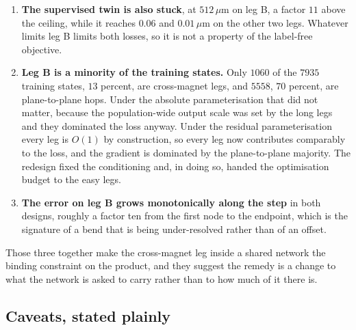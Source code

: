 \documentclass[11pt,a4paper]{article}
\newcommand{\um}{\ensuremath{\,\mu\mathrm{m}}}
\begin{document}
\begin{enumerate}
  \item \textbf{The supervised twin is also stuck}, at $512\um$ on leg B, a
  factor $11$ above the ceiling, while it reaches $0.06$ and $0.01\um$ on the
  other two legs. Whatever limits leg B limits both losses, so it is not a
  property of the label-free objective.
  \item \textbf{Leg B is a minority of the training states.} Only $1060$ of the
  $7935$ training states, $13$ percent, are cross-magnet legs, and $5558$, $70$
  percent, are plane-to-plane hops. Under the absolute parameterisation that did
  not matter, because the population-wide output scale was set by the long legs
  and they dominated the loss anyway. Under the residual parameterisation every
  leg is $O(1)$ by construction, so every leg now contributes comparably to the
  loss, and the gradient is dominated by the plane-to-plane majority. The
  redesign fixed the conditioning and, in doing so, handed the optimisation
  budget to the easy legs.
  \item \textbf{The error on leg B grows monotonically along the step} in both
  designs, roughly a factor ten from the first node to the endpoint, which is
  the signature of a bend that is being under-resolved rather than of an offset.
\end{enumerate}

Those three together make the cross-magnet leg inside a shared network the
binding constraint on the product, and they suggest the remedy is a change to
what the network is asked to carry rather than to how much of it there is.

\subsection{Caveats, stated plainly}
\end{document}
